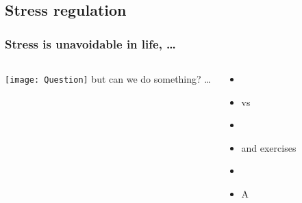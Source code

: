 \documentclass[../main.tex]{subfiles}
\begin{document}
\subsection{Stress regulation}

\begin{frame}
\frametitle{Stress is unavoidable in life, \ldots}
\begin{columns}[c] %
\texttt{[image: Question]}
 but can we do something? \ldots 
 \begin{itemize}
 \item {}
 \item {} vs 
 \item {} 
 \item {} and  exercises
 \item {}
 \item A  
 \end{itemize}
\end{columns}
\end{frame}
\end{document}
